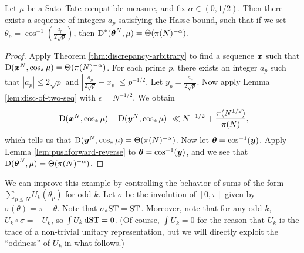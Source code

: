 \begin{theorem}\label{thm:integral-a_p-alpha}
Let $\mu$ be a Sato--Tate compatible measure, and fix $\alpha\in (0,1/2)$. 
Then there exists a sequence of integers $a_p$ satisfying the Hasse bound, 
such that if we set $\theta_p = \cos^{-1}\left(\frac{a_p}{2\sqrt p}\right)$, 
then $\operatorname{D}^\star({\boldsymbol\theta}^N,\mu) = \Theta(\pi(N)^{-\alpha})$. 
\end{theorem}
\begin{proof}
Apply Theorem \ref{thm:discrepancy-arbitrary} to find a sequence ${\boldsymbol x}$ such 
that $\operatorname{D}({\boldsymbol x}^N,\cos_\ast \mu) = \Theta(\pi(N)^{-\alpha})$. For each prime 
$p$, there exists an integer $a_p$ such that $|a_p|\leqslant 2\sqrt p$ and 
$\left| \frac{a_p}{2\sqrt p} - x_p\right| \leqslant p^{-1/2}$. Let 
$y_p = \frac{a_p}{2\sqrt p}$. Now apply 
Lemma \ref{lem:disc-of-two-seq} with $\epsilon = N^{-1/2}$. We obtain 
\[
	\left| \operatorname{D}({\boldsymbol x}^N,\cos_\ast \mu) - \operatorname{D}({\boldsymbol y}^N, \cos_\ast \mu)\right| \ll  N^{-1/2} + \frac{\pi(N^{1/2})}{\pi(N)} ,
\]
which tells us that $\operatorname{D}({\boldsymbol y}^N,\cos_\ast\mu) = \Theta(\pi(N)^{-\alpha})$. 
Now let ${\boldsymbol\theta} = \cos^{-1}({\boldsymbol y})$. Apply Lemma \ref{lem:pushforward-reverse} to 
${\boldsymbol\theta} = \cos^{-1}({\boldsymbol y})$, and we see that 
$\operatorname{D}({\boldsymbol\theta}^N,\mu) = \Theta(\pi(N)^{-\alpha})$. 
\end{proof}

We can improve this example by controlling the behavior of sums of the form 
$\sum_{p\leqslant N} U_k(\theta_p)$ for odd $k$. Let $\sigma$ be 
the involution of $[0,\pi]$ given by $\sigma(\theta) = \pi-\theta$. Note that 
$\sigma_\ast \mathrm{ST} = \mathrm{ST}$. Moreover, note that for any odd $k$, 
$U_k\circ\sigma = - U_k$, so $\int U_k\, \mathrm{d}\mathrm{ST} = 0$. (Of course, 
$\int U_k = 0$ for the reason that $U_k$ is the trace of a non-trivial unitary 
representation, but we will directly exploit the ``oddness'' of $U_k$ in what 
follows.)


